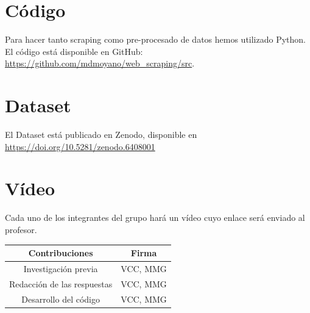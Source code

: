 \documentclass[IB]{PlantillaPACnova_Est}
\begin{document}


\section{Código}

Para hacer tanto scraping como pre-procesado de datos hemos utilizado Python. El código está disponible en GitHub: \url{https://github.com/mdmoyano/web_scraping/src}.

\section{Dataset}

El Dataset está publicado en Zenodo, disponible en  \url{https://doi.org/10.5281/zenodo.6408001}


\section{Vídeo}

Cada uno de los integrantes del grupo hará un vídeo cuyo enlace será enviado al profesor.\\

\begin{center}
\begin{tabular}{|c|c|}
\hline
\textbf{Contribuciones} & \textbf{Firma} \\ 
\hline
 Investigación previa & VCC, MMG \\ 
 \hline
 Redacción de las respuestas & VCC, MMG \\
 \hline 
 Desarrollo del código & VCC, MMG \\
 \hline
\end{tabular}

\end{center}


%
%
\newpage

 
\listoffigures
\end{document}
